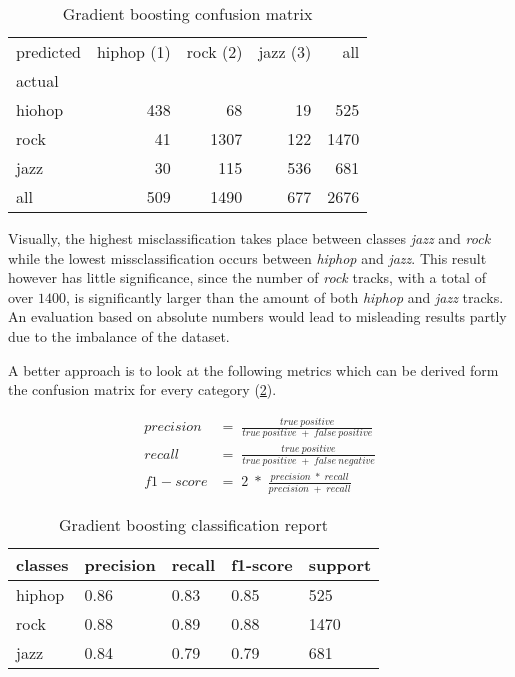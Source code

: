 \begin{table}[H]
  \centering
  \begin{tabular}{lrrrr}
    \toprule
    predicted & hiphop (1) & rock (2) & jazz (3) &   all \\
    actual &      &       &      &       \\
    \midrule
    hiohop &  438 &    68 &   19 &   525 \\
    rock   &   41 &  1307 &  122 &  1470 \\
    jazz   &   30 &   115 &  536 &   681 \\
    all    &  509 &  1490 &  677 &  2676 \\
    \bottomrule
    \end{tabular}
  \caption{Gradient boosting confusion matrix}%
  \label{tbl:gb_confusion_matrix}%
\end{table} 

Visually, the highest misclassification takes place between classes \emph{jazz} and \emph{rock} while the lowest missclassification occurs
between \emph{hiphop} and \emph{jazz}. This result however has little significance, since the number of \emph{rock} tracks, with a total of over 
\(1400\), is significantly larger than the amount of both \emph{hiphop} and \emph{jazz} tracks. An evaluation based on absolute numbers would lead to 
misleading results partly due to the imbalance of the dataset. 

A better approach is to look at the following metrics which can be derived form the confusion matrix for every category \cite[p.235]{Davis_2006} \cite[p.862]{fawcett2006introduction}(\ref{tbl:gb_classification_Report}). 

\begin{equation*}
  \begin{aligned}
    precision &= \;\frac{true\:positive}{true\:positive\;+\;false\:positive}
    \\
    recall &= \;\frac{true\:positive}{true\:positive\;+\;false\:negative}
    \\
    f1-score &= \;2\;*\;\frac{precision\;*\;recall}{precision\;+\;recall}
  \end{aligned}
\end{equation*}

\begin{table}[H]
  \centering
  \begin{tabular}{lllll}
    \toprule
    classes & precision & recall & f1-score & support \\
    \midrule
     hiphop &      0.86 &   0.83 &     0.85 &     525 \\
       rock &      0.88 &   0.89 &     0.88 &    1470 \\
       jazz &      0.84 &   0.79 &     0.79 &     681 \\
    \bottomrule
    \end{tabular}
  \caption{Gradient boosting classification report}%
  \label{tbl:gb_classification_Report}%
\end{table} 

